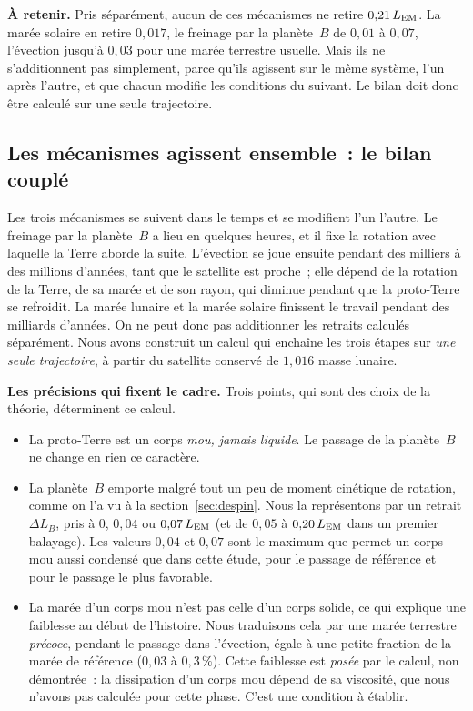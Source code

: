 \documentclass[11pt,a4paper]{article}
\newcommand{\LEM}{\ensuremath{L_{\rm EM}}}
\begin{document}
\textbf{À retenir.} Pris séparément, aucun de ces mécanismes ne retire $0{,}21\,\LEM$. La marée solaire en retire $0{,}017$, le freinage par la planète~$B$ de $0{,}01$ à $0{,}07$, l'évection jusqu'à $0{,}03$ pour une marée terrestre usuelle. Mais ils ne s'additionnent pas simplement, parce qu'ils agissent sur le même système, l'un après l'autre, et que chacun modifie les conditions du suivant. Le bilan doit donc être calculé sur une seule trajectoire.

\subsection{Les mécanismes agissent ensemble~: le bilan couplé}
\label{sec:couple}

Les trois mécanismes se suivent dans le temps et se modifient l'un l'autre. Le freinage par la planète~$B$ a lieu en quelques heures, et il fixe la rotation avec laquelle la Terre aborde la suite. L'évection se joue ensuite pendant des milliers à des millions d'années, tant que le satellite est proche~; elle dépend de la rotation de la Terre, de sa marée et de son rayon, qui diminue pendant que la proto-Terre se refroidit. La marée lunaire et la marée solaire finissent le travail pendant des milliards d'années. On ne peut donc pas additionner les retraits calculés séparément. Nous avons construit un calcul qui enchaîne les trois étapes sur \emph{une seule trajectoire}, à partir du satellite conservé de $1{,}016$ masse lunaire.

\textbf{Les précisions qui fixent le cadre.} Trois points, qui sont des choix de la théorie, déterminent ce calcul.
\begin{itemize}[leftmargin=1.6em,itemsep=2pt]
\item La proto-Terre est un corps \emph{mou, jamais liquide}. Le passage de la planète~$B$ ne change en rien ce caractère.
\item La planète~$B$ emporte malgré tout un peu de moment cinétique de rotation, comme on l'a vu à la section~\ref{sec:despin}. Nous la représentons par un retrait $\Delta L_B$, pris à $0$, $0{,}04$ ou $0{,}07\,\LEM$ (et de $0{,}05$ à $0{,}20\,\LEM$ dans un premier balayage). Les valeurs $0{,}04$ et $0{,}07$ sont le maximum que permet un corps mou aussi condensé que dans cette étude, pour le passage de référence et pour le passage le plus favorable.
\item La marée d'un corps mou n'est pas celle d'un corps solide, ce qui explique une faiblesse au début de l'histoire. Nous traduisons cela par une marée terrestre \emph{précoce}, pendant le passage dans l'évection, égale à une petite fraction de la marée de référence ($0{,}03$ à $0{,}3\,\%$). Cette faiblesse est \emph{posée} par le calcul, non démontrée~: la dissipation d'un corps mou dépend de sa viscosité, que nous n'avons pas calculée pour cette phase. C'est une condition à établir.
\end{itemize}
\end{document}
